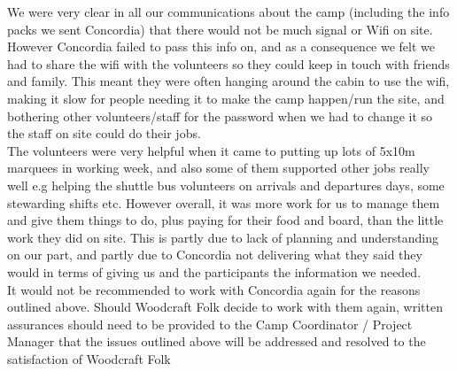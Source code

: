 We were very clear in all our communications about the camp (including the info packs we sent Concordia) that there would not be much signal or Wifi on site. However Concordia failed to pass this info on, and as a consequence we felt we had to share the wifi with the volunteers so they could keep in touch with friends and family. This meant they were often hanging around the cabin to use the wifi, making it slow for people needing it to make the camp happen/run the site, and bothering other volunteers/staff for the password when we had to change it so the staff on site could do their jobs. \\

The volunteers were very helpful when it came to putting up lots of 5x10m marquees in working week, and also some of them supported other jobs really well e.g helping the shuttle bus volunteers on arrivals and departures days, some stewarding shifts etc. However overall, it was more work for us to manage them and give them things to do, plus paying for their food and board, than the little work they did on site. This is partly due to lack of planning and understanding on our part, and partly due to Concordia not delivering what they said they would in terms of giving us and the participants the information we needed.\\

It would not be recommended to work with Concordia again for the reasons outlined above. Should Woodcraft Folk decide to work with them again, written assurances should need to be provided to the Camp Coordinator / Project Manager that the issues outlined above will be addressed and resolved to the satisfaction of Woodcraft Folk
